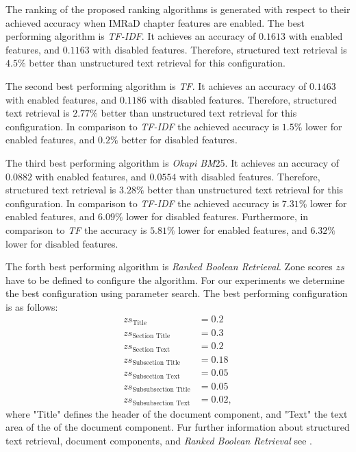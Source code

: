 The ranking of the proposed ranking algorithms is generated with respect to their achieved accuracy when IMRaD chapter features are enabled. The best performing algorithm is \textit{TF-IDF}. It achieves an accuracy of $0.1613$ with enabled features, and $0.1163$ with disabled features. Therefore, structured text retrieval is $4.5 \%$ better than unstructured text retrieval for this configuration.

The second best performing algorithm is \textit{TF}. It achieves an accuracy of $0.1463$ with enabled features, and $0.1186$ with disabled features. Therefore, structured text retrieval is $2.77 \%$ better than unstructured text retrieval for this configuration. In comparison to \textit{TF-IDF} the achieved accuracy is $1.5 \%$ lower for enabled features, and $0.2 \%$ better for disabled features.

The third best performing algorithm is \textit{Okapi BM$25$}. It achieves an accuracy of $0.0882$ with enabled features, and $0.0554$ with disabled features. Therefore, structured text retrieval is $3.28 \%$ better than unstructured text retrieval for this configuration. In comparison to \textit{TF-IDF} the achieved accuracy is $7.31 \%$ lower for enabled features, and $6.09 \%$ lower for disabled features. Furthermore, in comparison to \textit{TF} the accuracy is $5.81 \%$ lower for enabled features, and $6.32 \%$ lower for disabled features. 

The forth best performing algorithm is \textit{Ranked Boolean Retrieval}. Zone scores $zs$ have to be defined to configure the algorithm. For our experiments we determine the best configuration using parameter search. The best performing configuration is as follows:
\begin{align*}
  zs_{\text{Title}} & = 0.2                \nonumber \\
  zs_{\text{Section Title}} & = 0.3        \nonumber \\
  zs_{\text{Section Text}} & = 0.2         \nonumber \\
  zs_{\text{Subsection Title}} & = 0.18    \nonumber \\
  zs_{\text{Subsection Text}} & = 0.05     \nonumber \\
  zs_{\text{Subsubsection Title}} & =0.05  \nonumber \\
  zs_{\text{Subsubsection Text}} & = 0.02, \nonumber
\end{align*}
where "Title" defines the header of the document component, and "Text" the text area of the of the document component. Fur further information about structured text retrieval, document components, and \textit{Ranked Boolean Retrieval} see . 

